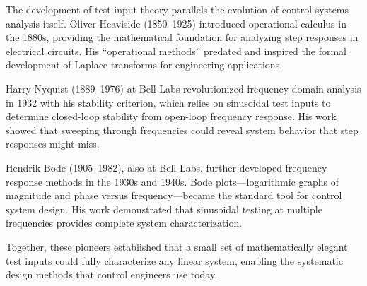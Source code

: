 \begin{historicalbox}
The development of test input theory parallels the evolution of control systems analysis itself. Oliver Heaviside (1850--1925) introduced operational calculus in the 1880s, providing the mathematical foundation for analyzing step responses in electrical circuits. His ``operational methods'' predated and inspired the formal development of Laplace transforms for engineering applications.

Harry Nyquist (1889--1976) at Bell Labs revolutionized frequency-domain analysis in 1932 with his stability criterion, which relies on sinusoidal test inputs to determine closed-loop stability from open-loop frequency response. His work showed that sweeping through frequencies could reveal system behavior that step responses might miss.

Hendrik Bode (1905--1982), also at Bell Labs, further developed frequency response methods in the 1930s and 1940s. Bode plots---logarithmic graphs of magnitude and phase versus frequency---became the standard tool for control system design. His work demonstrated that sinusoidal testing at multiple frequencies provides complete system characterization.

Together, these pioneers established that a small set of mathematically elegant test inputs could fully characterize any linear system, enabling the systematic design methods that control engineers use today.
\end{historicalbox}


